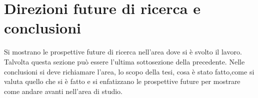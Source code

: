 \chapter{Direzioni future di ricerca e conclusioni}
\label{capitolo6}

Si mostrano le prospettive future di ricerca nell'area dove si è svolto il lavoro. Talvolta questa sezione può essere l'ultima sottosezione della precedente. Nelle conclusioni si deve richiamare l'area, lo scopo della tesi, cosa è stato fatto,come si valuta quello che si è fatto e si enfatizzano le prospettive future per mostrare come andare avanti nell'area di studio.
